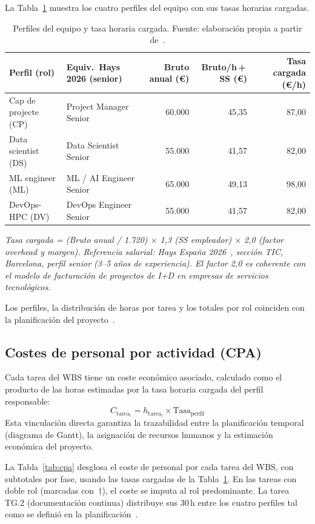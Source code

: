 \documentclass[11pt,a4paper]{article}
\begin{document}
La Tabla~\ref{tab:costes-rol} muestra los cuatro perfiles del equipo con sus tasas horarias cargadas.

\begin{table}[H]
\centering
\caption{Perfiles del equipo y tasa horaria cargada. Fuente: elaboración propia a partir de~\cite{hays2026}.}
\label{tab:costes-rol}
\footnotesize
\begin{tabular}{l l r r r}
\toprule
\textbf{Perfil (rol)} & \textbf{Equiv.\ Hays 2026 (senior)} & \textbf{Bruto anual (\euro{})} & \textbf{Bruto/h\,+\,SS (\euro{})} & \textbf{Tasa cargada (\euro{}/h)} \\
\midrule
Cap de projecte (CP)   & Project Manager Senior  & 60.000 & 45,35 & 87,00 \\
Data scientist (DS)    & Data Scientist Senior   & 55.000 & 41,57 & 82,00 \\
ML engineer (ML)       & ML / AI Engineer Senior & 65.000 & 49,13 & 98,00 \\
DevOps-HPC (DV)        & DevOps Engineer Senior  & 55.000 & 41,57 & 82,00 \\
\bottomrule
\end{tabular}
\end{table}

\noindent\textit{\scriptsize Tasa cargada = (Bruto anual / 1.720) $\times$ 1,3 (SS empleador) $\times$ 2,0 (factor overhead y margen). Referencia salarial: Hays España 2026~\cite{hays2026}, sección TIC, Barcelona, perfil senior (3--5 años de experiencia). El factor 2,0 es coherente con el modelo de facturación de proyectos de I+D en empresas de servicios tecnológicos.}

\noindent Los perfiles, la distribución de horas por tarea y los totales por rol coinciden con la planificación del proyecto~\cite{gep23e2}.

\subsection{Costes de personal por actividad (CPA)}

Cada tarea del WBS tiene un coste económico asociado, calculado como el producto de las horas estimadas por la tasa horaria cargada del perfil responsable:
\[
C_{\text{tarea}_i} = h_{\text{tarea}_i} \times \text{Tasa}_{\text{perfil}}
\]
Esta vinculación directa garantiza la trazabilidad entre la planificación temporal (diagrama de Gantt), la asignación de recursos humanos y la estimación económica del proyecto.

La Tabla~\ref{tab:cpa} desglosa el coste de personal por cada tarea del WBS, con subtotales por fase, usando las tasas cargadas de la Tabla~\ref{tab:costes-rol}. En las tareas con doble rol (marcadas con~$\dagger$), el coste se imputa al rol predominante. La tarea TG.2 (documentación continua) distribuye sus 30\,h entre los cuatro perfiles tal como se definió en la planificación~\cite{gep23e2}.
\end{document}
